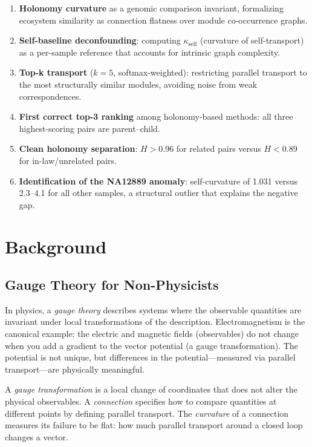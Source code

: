 \documentclass{../yalumba}
\begin{document}
\begin{enumerate}
  \item \textbf{Holonomy curvature} as a genomic comparison invariant,
    formalizing ecosystem similarity as connection flatness over module
    co-occurrence graphs.
  \item \textbf{Self-baseline deconfounding}: computing $\kappa_{\text{self}}$
    (curvature of self-transport) as a per-sample reference that accounts
    for intrinsic graph complexity.
  \item \textbf{Top-k transport} ($k = 5$, softmax-weighted): restricting
    parallel transport to the most structurally similar modules, avoiding
    noise from weak correspondences.
  \item \textbf{First correct top-3 ranking} among holonomy-based methods:
    all three highest-scoring pairs are parent--child.
  \item \textbf{Clean holonomy separation}: $H > 0.96$ for related pairs
    versus $H < 0.89$ for in-law/unrelated pairs.
  \item \textbf{Identification of the NA12889 anomaly}: self-curvature
    of 1.031 versus 2.3--4.1 for all other samples, a structural outlier
    that explains the negative gap.
\end{enumerate}


\section{Background}
\label{sec:background}

\subsection{Gauge Theory for Non-Physicists}

In physics, a \emph{gauge theory} describes systems where the observable
quantities are invariant under local transformations of the description.
Electromagnetism is the canonical example: the electric and magnetic fields
(observables) do not change when you add a gradient to the vector potential
(a gauge transformation).  The potential is not unique, but differences in
the potential---measured via parallel transport---are physically meaningful.

\begin{definition}
A \emph{gauge transformation} is a local change of coordinates that does
not alter the physical observables.  A \emph{connection} specifies how to
compare quantities at different points by defining parallel transport.
The \emph{curvature} of a connection measures its failure to be flat:
how much parallel transport around a closed loop changes a vector.
\end{definition}
\end{document}
